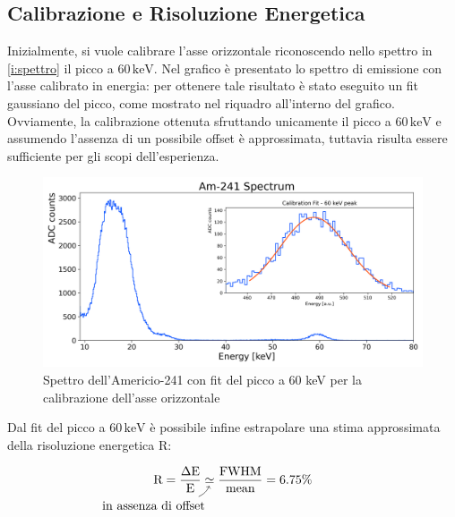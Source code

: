 \documentclass[twocolumn,10pt]{asme2ej}
\begin{document}
\subsection{Calibrazione e Risoluzione Energetica}\label{s:calibrazione}

Inizialmente, si vuole calibrare l'asse orizzontale riconoscendo nello spettro in \autoref{i:spettro} il picco a
$60\,\si{\kilo\electronvolt}$. Nel grafico è presentato lo spettro di emissione con l'asse calibrato in energia: per
ottenere tale risultato è stato eseguito un fit gaussiano del picco, come mostrato nel riquadro all'interno del grafico.
Ovviamente, la calibrazione ottenuta sfruttando unicamente il picco a $60\,\si{\kilo\electronvolt}$ e assumendo
l'assenza di un possibile offset è approssimata, tuttavia risulta essere sufficiente per gli scopi dell'esperienza. 

\begin{figure}
    \centering
    \includegraphics[width=\linewidth]{../Plots/am_spectrum_small.png}
    \caption{Spettro dell'Americio-241 con fit del picco a 60 keV per la calibrazione
               dell'asse orizzontale}
    \label{i:spettro}
    \vspace{-10pt}
\end{figure}

Dal fit del picco a $60\,\si{\kilo\electronvolt}$ è possibile infine estrapolare una stima approssimata della
risoluzione energetica R: 

\vspace{-15pt}
\begin{equation}
    \text{R} = \frac{\Delta\text{E}}{\text{E}}
    \underset{\mathllap{
      \begin{tikzpicture}
        \draw[->] (-0.3, 0) to[bend right=20] ++(0.3,2ex);
        \node[below left] at (0,0) {in assenza di offset};
      \end{tikzpicture}
    }}{\simeq}
    \frac{\text{FWHM}}{\text{mean}} = 6.75\%
\vspace{-5pt}
\end{equation}
\end{document}
